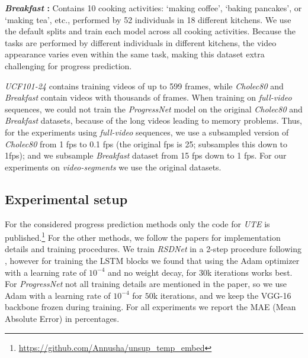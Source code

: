 \smallskip\noindent\textbf{\textsl{Breakfast} \cite{kuehne2014, kuehne2016}:} Contains 10 cooking activities: \eg `making coffee', `baking pancakes', or `making tea', etc., performed by 52 individuals in 18 different kitchens. 
We use the default splits and train each model across all cooking activities. 
Because the tasks are performed by different individuals in different kitchens, the video appearance varies even within the same task, making this dataset extra challenging for progress prediction.

\textsl{UCF101-24} contains training videos of up to 599 frames, while \textsl{Cholec80} and \textsl{Breakfast} contain videos with thousands of frames.
When training on \textsl{full-video} sequences, we could not train the \textsl{ProgressNet} model on the original \textsl{Cholec80} and \textsl{Breakfast} datasets, because of the long videos leading to memory problems.
Thus, for the experiments using \textsl{full-video} sequences, we use a subsampled version of \textsl{Cholec80} from 1 fps to 0.1 fps (the original fps is 25; \cite{twinanda2019} subsamples this down to 1fps); and we subsample \textsl{Breakfast} dataset from 15 fps down to 1 fps. 
For our experiments on \textsl{video-segments} we use the original datasets.

\subsection{Experimental setup}
For the considered progress prediction methods only the code for \textsl{UTE} is published.\footnote{\url{https://github.com/Annusha/unsup_temp_embed}} 
For the other methods, we follow the papers for implementation details and training procedures. 
We train \textsl{RSDNet} in a 2-step procedure following \cite{twinanda2019}, however for training the LSTM blocks we found that using the Adam optimizer with a learning rate of $10^{-4}$ and no weight decay, for $30$k iterations works best. 
For \textsl{ProgressNet} not all training details are mentioned in the paper, so we use Adam with a learning rate of $10^{-4}$ for $50$k iterations, and we keep the VGG-16 backbone frozen during training. 
For all experiments we report the MAE (Mean Absolute Error) in percentages.
